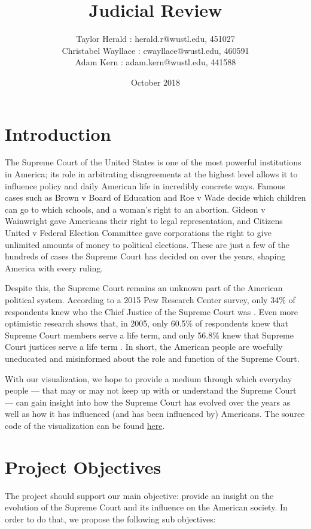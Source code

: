 \documentclass{article}
\title{Judicial Review}
\author{ Taylor Herald : herald.r@wustl.edu, 451027\\
            Christabel Wayllace : cwayllace@wustl.edu, 460591\\
            Adam Kern : adam.kern@wustl.edu, 441588
}
\date{October 2018}
\begin{document}
\maketitle

\section{Introduction}
The Supreme Court of the United States is one of the most powerful institutions in America; its role in arbitrating disagreements at the highest level allows it to influence policy and daily American life in incredibly concrete ways.  Famous cases such as Brown v Board of Education and Roe v Wade decide which children can go to which schools, and a woman's right to an abortion.  Gideon v Wainwright gave Americans their right to legal representation, and Citizens United v Federal Election Committee gave corporations the right to give unlimited amounts of money to political elections.  These are just a few of the hundreds of cases the Supreme Court has decided on over the years, shaping America with every ruling.

Despite this, the Supreme Court remains an unknown part of the American political system.  According to a 2015 Pew Research Center survey, only 34\% of respondents knew who the Chief Justice of the Supreme Court was \cite{pew-scotus-awareness}.  Even more optimistic research shows that, in 2005, only 60.5\% of respondents knew that Supreme Court members serve a life term, and only 56.8\% knew that Supreme Court justices serve a life term \cite{gibson-survey}.  In short, the American people are woefully uneducated and misinformed about the role and function of the Supreme Court.

With our visualization, we hope to provide a medium through which everyday people --- that may or may not keep up with or understand the Supreme Court --- can gain insight into how the Supreme Court has evolved over the years as well as how it has influenced (and has been influenced by) Americans. The source code of the visualization can be found \href{https://github.com/therald/Judicial-Review.git}{here}.

\section{Project Objectives}
The project should support  our main objective: provide an insight on the evolution of the Supreme Court and its influence on the American society. In order to do that, we propose the following sub objectives:
\end{document}
